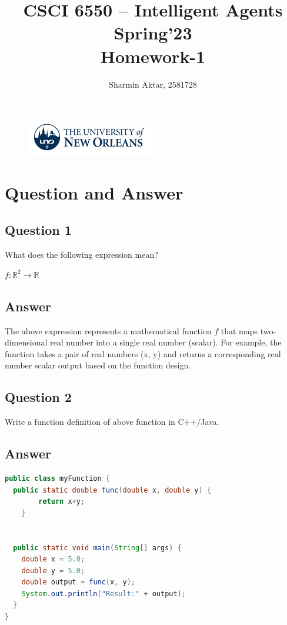 \documentclass[12]{article}
\title{\textbf{CSCI 6550 – Intelligent Agents\\Spring'23}\\\textbf{Homework-1}}
\author{Sharmin Aktar, 2581728}
\begin{document}
\begin{figure}
\centering
\includegraphics[width=0.5\textwidth]{uno_logo.png}
\end{figure}

\maketitle

\section*{Question and Answer}

\subsection*{Question 1}
What does the following expression mean?
\begin{center}
    $f: \mathbb{R}^2 \rightarrow \mathbb{R}$
\end{center}

\subsection*{Answer}
The above expression represents a mathematical function $f$ that maps two-dimensional real number into a single real number (scalar). For example, the function takes a pair of real numbers (x, y) and returns a corresponding real number scalar output based on the function design.

\subsection*{Question 2}
Write a function definition of above function in C++/Java.
\subsection*{Answer}

\begin{lstlisting}[language=Java]
public class myFunction {
  public static double func(double x, double y) {
        return x+y;
    }
  
  
  public static void main(String[] args) { 
    double x = 5.0;
    double y = 5.0;
    double output = func(x, y);
    System.out.println("Result:" + output);
  }
}
\end{lstlisting}
\end{document}
